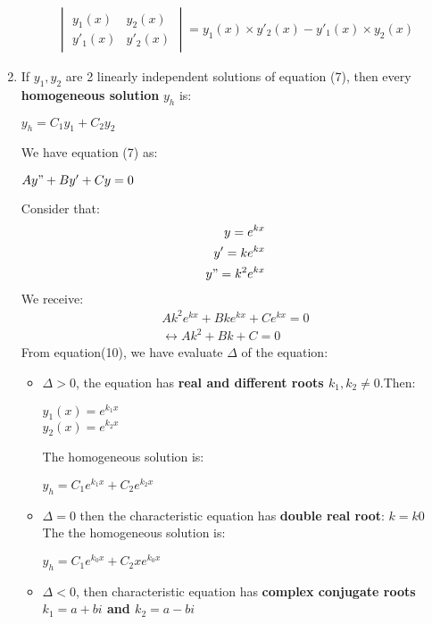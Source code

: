 \documentclass[10pt]{article}
\begin{document}
\begin{enumerate}
\begin{center}
\begin{align*}
\begin{vmatrix}
	y_1(x) & y_2(x)\\
	y'_1(x) & y'_2(x)
	\end{vmatrix}
	= y_1(x) \times y'_2(x) - y'_1(x) \times y_2(x)
	\end{align*}
	\end{center}
	\item If $y_1,y_2$ are 2 linearly independent solutions of equation (7), then every \textbf{homogeneous solution} \textit{$y_h$} is:
	\begin{center}
	$y_h = C_1y_1 + C_2y_2$
	\end{center}
	We have equation (7) as:
	\begin{center}
	$Ay" + By' + Cy = 0$
	\end{center}
	Consider that:
	\begin{align*}
	y = e^{kx}\\
	y' = ke^{kx}\\
	y" = k^2e^{kx}
	\end{align*}
	We receive:
	\begin{align}
	Ak^2e^{kx} + Bke^{kx} + Ce^{kx} = 0\\
	\leftrightarrow{Ak^2 + Bk + C = 0}
	\end{align}
	From equation(10), we have evaluate $\Delta$ of the equation:
	\begin{itemize}
		\item $\Delta > 0$, the equation has \textbf{real and different roots $k_1,k_2 \not = 0$}.Then:
		\begin{center}
		$y_1(x) = e^{k_1x}$\\
		$y_2(x) = e^{k_2x}$
		\end{center}
		The homogeneous solution is:
		\begin{mybox}
		\begin{center}
		 $y_h = C_1e^{k_1x} + C_2e^{k_2x}$
		 \end{center}
		 \end{mybox}
		 \item $\Delta = 0$ then the characteristic equation has \textbf{double real root}: $k = k{0}$\\
		 The the homogeneous solution is:
		 \begin{mybox}
		 \begin{center}
		 $y_h = C_1e^{k_0x} + C_2xe^{k_0x}$
		 \end{center}
		 \end{mybox}
		 \item $\Delta < 0$, then characteristic equation has \textbf{complex conjugate roots $k_1 = a + bi$ and $k_2 = a - bi$}\\

\end{itemize}
\end{enumerate}
\end{document}
